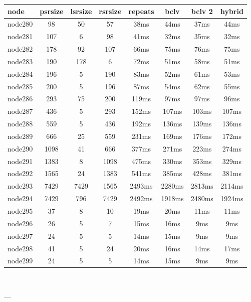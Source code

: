 \begin{tabular}{|l|c|c|c|c|c|c|c|}
\hline node & psrsize & lsrsize & rsrsize   & repeats & bclv & bclv 2 & hybrid\\
    \hline node280 & 98 & 50 & 57 & 38ms & 44ms & 37ms & 44ms\\
    \hline node281 & 107 & 6 & 98 & 41ms & 32ms & 35ms & 32ms\\
    \hline node282 & 178 & 92 & 107 & 66ms & 75ms & 76ms & 75ms\\
    \hline node283 & 190 & 178 & 6 & 72ms & 51ms & 58ms & 51ms\\
    \hline node284 & 196 & 5 & 190 & 83ms & 52ms & 61ms & 53ms\\
    \hline node285 & 200 & 5 & 196 & 87ms & 54ms & 62ms & 55ms\\
    \hline node286 & 293 & 75 & 200 & 119ms & 97ms & 97ms & 96ms\\
    \hline node287 & 436 & 5 & 293 & 152ms & 107ms & 103ms & 107ms\\
    \hline node288 & 559 & 5 & 436 & 192ms & 136ms & 139ms & 136ms\\
    \hline node289 & 666 & 25 & 559 & 231ms & 169ms & 176ms & 172ms\\
    \hline node290 & 1098 & 41 & 666 & 377ms & 271ms & 223ms & 274ms\\
    \hline node291 & 1383 & 8 & 1098 & 475ms & 330ms & 353ms & 329ms\\
    \hline node292 & 1565 & 24 & 1383 & 541ms & 385ms & 428ms & 381ms\\
    \hline node293 & 7429 & 7429 & 1565 & 2493ms & 2280ms & 2813ms & 2114ms\\
    \hline node294 & 7429 & 796 & 7429 & 2492ms & 1918ms & 2480ms & 1924ms\\
    \hline node295 & 37 & 8 & 10 & 19ms & 20ms & 11ms & 11ms\\
    \hline node296 & 26 & 5 & 7 & 15ms & 16ms & 9ms & 9ms\\
    \hline node297 & 24 & 5 & 5 & 14ms & 15ms & 9ms & 9ms\\
    \hline node298 & 41 & 5 & 24 & 20ms & 16ms & 14ms & 17ms\\
    \hline node299 & 24 & 5 & 5 & 14ms & 15ms & 9ms & 9ms\\

\hline
\end{tabular} \

---


